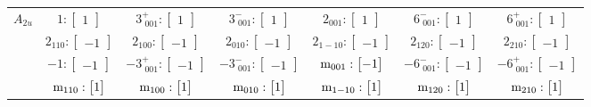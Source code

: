 \documentclass[fleqn,8pt,landscape]{jsarticle}
\begin{document}
\begin{longtable}{ccccccc}
$ A_{2u} $ & $ 1:\begin{bmatrix} 1 \end{bmatrix} $ & $ 3^{+}_{\,\,001}:\begin{bmatrix} 1 \end{bmatrix} $ & $ 3^{-}_{\,\,001}:\begin{bmatrix} 1 \end{bmatrix} $ & $ 2{}_{001}:\begin{bmatrix} 1 \end{bmatrix} $ & $ 6^{-}_{\,\,001}:\begin{bmatrix} 1 \end{bmatrix} $ & $ 6^{+}_{\,\,001}:\begin{bmatrix} 1 \end{bmatrix} $ \\
& $ 2{}_{110}:\begin{bmatrix} -1 \end{bmatrix} $ & $ 2{}_{100}:\begin{bmatrix} -1 \end{bmatrix} $ & $ 2{}_{010}:\begin{bmatrix} -1 \end{bmatrix} $ & $ 2{}_{1-10}:\begin{bmatrix} -1 \end{bmatrix} $ & $ 2{}_{120}:\begin{bmatrix} -1 \end{bmatrix} $ & $ 2{}_{210}:\begin{bmatrix} -1 \end{bmatrix} $ \\
& $ -1:\begin{bmatrix} -1 \end{bmatrix} $ & $ -3^{+}_{\,\,001}:\begin{bmatrix} -1 \end{bmatrix} $ & $ -3^{-}_{\,\,001}:\begin{bmatrix} -1 \end{bmatrix} $ & $ {\rm m}_{001}:\begin{bmatrix} -1 \end{bmatrix} $ & $ -6^{-}_{\,\,001}:\begin{bmatrix} -1 \end{bmatrix} $ & $ -6^{+}_{\,\,001}:\begin{bmatrix} -1 \end{bmatrix} $ \\
& $ {\rm m}_{110}:\begin{bmatrix} 1 \end{bmatrix} $ & $ {\rm m}_{100}:\begin{bmatrix} 1 \end{bmatrix} $ & $ {\rm m}_{010}:\begin{bmatrix} 1 \end{bmatrix} $ & $ {\rm m}_{1-10}:\begin{bmatrix} 1 \end{bmatrix} $ & $ {\rm m}_{120}:\begin{bmatrix} 1 \end{bmatrix} $ & $ {\rm m}_{210}:\begin{bmatrix} 1 \end{bmatrix} $ \\ \hline

\end{longtable}
\end{document}

